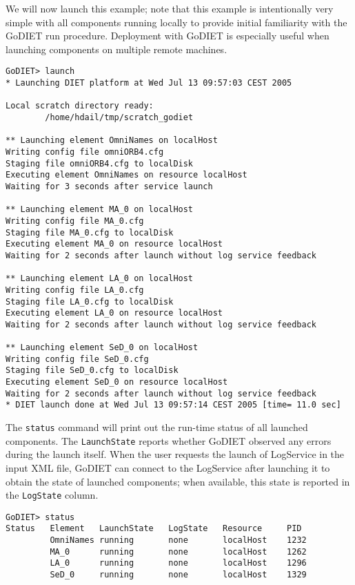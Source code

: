 We will now launch this example; note that this example is intentionally very 
simple with all components running locally to provide initial familiarity 
with the GoDIET run procedure.  Deployment with GoDIET is especially useful 
when launching components on multiple remote machines.

\begin{verbatim}
GoDIET> launch
* Launching DIET platform at Wed Jul 13 09:57:03 CEST 2005

Local scratch directory ready:
        /home/hdail/tmp/scratch_godiet

** Launching element OmniNames on localHost
Writing config file omniORB4.cfg
Staging file omniORB4.cfg to localDisk
Executing element OmniNames on resource localHost
Waiting for 3 seconds after service launch

** Launching element MA_0 on localHost
Writing config file MA_0.cfg
Staging file MA_0.cfg to localDisk
Executing element MA_0 on resource localHost
Waiting for 2 seconds after launch without log service feedback

** Launching element LA_0 on localHost
Writing config file LA_0.cfg
Staging file LA_0.cfg to localDisk
Executing element LA_0 on resource localHost
Waiting for 2 seconds after launch without log service feedback

** Launching element SeD_0 on localHost
Writing config file SeD_0.cfg
Staging file SeD_0.cfg to localDisk
Executing element SeD_0 on resource localHost
Waiting for 2 seconds after launch without log service feedback
* DIET launch done at Wed Jul 13 09:57:14 CEST 2005 [time= 11.0 sec]
\end{verbatim}

The \texttt{status} command will print out the run-time status of all launched 
components.  The \texttt{LaunchState} reports whether GoDIET observed
any errors during the launch itself.  When the user requests the launch
of LogService in the input XML file, GoDIET can connect to the LogService 
after launching it to obtain the state of launched components; when
available, this state is reported in the \texttt{LogState} column.

\begin{verbatim}
GoDIET> status
Status   Element   LaunchState   LogState   Resource     PID
         OmniNames running       none       localHost    1232
         MA_0      running       none       localHost    1262
         LA_0      running       none       localHost    1296
         SeD_0     running       none       localHost    1329
\end{verbatim}

